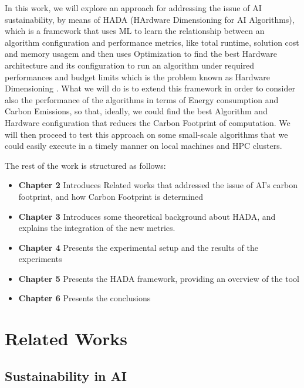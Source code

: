 \documentclass[a4paper,singleside,12pt]{report} %
\begin{document}
In this work, we will explore an approach for addressing the issue of AI sustainability, by means of HADA (HArdware 
Dimensioning for AI Algorithms), which is a framework that uses ML to learn the relationship between an algorithm 
configuration and performance metrics, like total runtime, solution cost and memory usagem and then uses Optimization to find 
the best  Hardware architecture and its configuration to run an algorithm under required performances and budget limits
which is the problem known as Hardware Dimensioning \cite{DEFILIPPO2022109199}. What we will do is to extend this framework
in order to consider also the performance of the algorithms in terms of Energy consumption and Carbon Emissions, so that, 
ideally, we could find the best Algorithm and Hardware configuration that reduces the Carbon Footprint of computation. We 
will then proceed to test this approach on some small-scale algorithms that we could easily execute in a timely manner 
on local machines and HPC clusters.

The rest of the work is structured as follows:
\begin{itemize}
    \item \textbf{Chapter 2} Introduces Related works that addressed the issue of AI's carbon footprint, and how Carbon Footprint is determined
    \item \textbf{Chapter 3} Introduces some theoretical background about HADA, and explains the integration of the new metrics.
    \item \textbf{Chapter 4} Presents the experimental setup and the results of the experiments
    \item \textbf{Chapter 5} Presents the HADA framework, providing an overview of the tool
    \item \textbf{Chapter 6} Presents the conclusions
\end{itemize}

\chapter{Related Works}

\section{Sustainability in AI}
\end{document}
